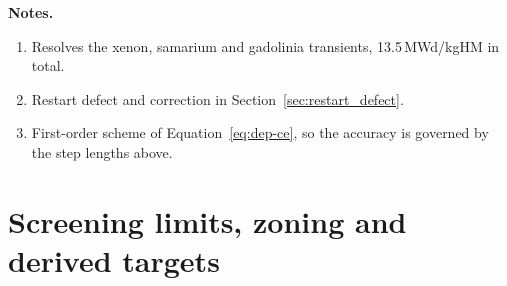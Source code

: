 \noindent \textbf{Notes.}
\begin{enumerate}[label=(\alph*), nosep]
  \item Resolves the xenon, samarium and gadolinia transients, 13.5\,MWd/kgHM in total.
  \item Restart defect and correction in Section~\ref{sec:restart_defect}.
  \item First-order scheme of Equation~\eqref{eq:dep-ce}, so the accuracy is
        governed by the step lengths above.
\end{enumerate}

\section{Screening limits, zoning and derived targets}
\label{app:inputs-limits}

